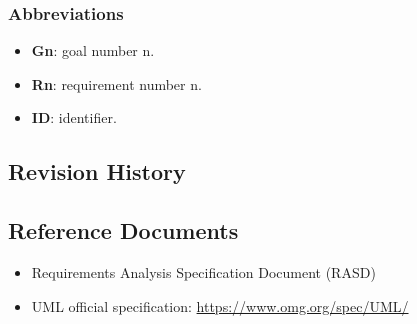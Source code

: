 \documentclass[table, 12pt]{article}
\begin{document}
\subsubsection{Abbreviations}
\begin{itemize}
    \item \textbf{Gn}: goal number n.
    \item \textbf{Rn}: requirement number n.
    \item \textbf{ID}: identifier.
\end{itemize}

\subsection{Revision History}

\subsection{Reference Documents}
\begin{itemize}
    \item Requirements Analysis Specification Document (RASD)
    \item UML official specification: \href{https://www.omg.org/spec/UML/}{https://www.omg.org/spec/UML/}
\end{itemize}
\end{document}
